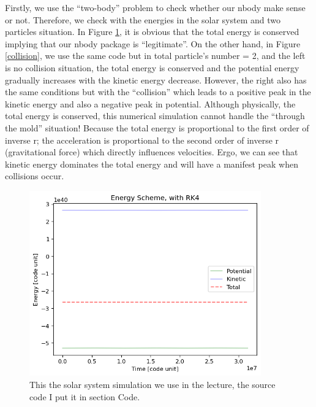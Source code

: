 \documentclass[12pt]{article}
\begin{document}
    Firstly, we use the ``two-body'' problem to check whether our {\ttfamily nbody} make sense or not. Therefore, we check with the energies in the solar system and two particles situation. In Figure \ref{2body}, it is obvious that the total energy is conserved implying that our {\ttfamily nbody} package is ``legitimate''. On the other hand, in Figure \ref{collision}, we use the same code but in total particle's number = 2, and the left is no collision situation, the total energy is conserved and the potential energy gradually increases with the kinetic energy decrease. However, the right also has the same conditions but with the ``collision'' which leads to a positive peak in the kinetic energy and also a negative peak in potential. Although physically, the total energy is conserved, this numerical simulation cannot handle the ``through the mold'' situation! Because the total energy is proportional to the first order of inverse r; the acceleration is proportional to the second order of inverse r (gravitational force) which directly influences velocities. Ergo, we can see that kinetic energy dominates the total energy and will have a manifest peak when collisions occur.

    \begin{figure}[H]
        \centering
        \includegraphics[width = 10cm]{./2body.png}  
        \caption{This the solar system simulation we use in the lecture, the source code I put it in section Code.}
        \label{2body}
    \end{figure}
\end{document}
